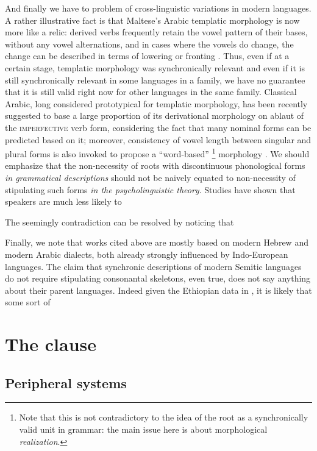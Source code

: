 \documentclass[a4paper, oneside, 12pt]{report}
\newcommand{\category}[1]{\textsc{#1}}
\begin{document}
And finally we have to problem of cross-linguistic variations in modern languages.
A rather illustrative fact is that Maltese's Arabic templatic morphology is now more like a relic:
derived verbs frequently retain the vowel pattern of their bases,
without any vowel alternations,
and in cases where the vowels do change,
the change can be described in terms of lowering or fronting
\citep{hoberman2008verbal}.
Thus, even if at a certain stage, templatic morphology was synchronically relevant
and even if it is still synchronically relevant in some languages in a family,
we have no guarantee that it is still valid right now
for other languages in the same family.
Classical Arabic, long considered prototypical for templatic morphology,
has been recently suggested to base a large proportion of its derivational morphology
on ablaut of the \category{imperfective} verb form,
considering the fact that many nominal forms can be predicted based on it;
moreover, consistency of vowel length between singular and plural forms is also invoked to propose
a ``word-based''%
\footnote{
    Note that this is not contradictory to the idea of the root as a synchronically valid unit in grammar:
    the main issue here is about morphological \emph{realization}.
}
morphology \citep{benmamoun20085}.
We should emphasize that the non-necessity of roots with discontinuous phonological forms
\emph{in grammatical descriptions}
should not be naively equated to non-necessity of stipulating such forms
\emph{in the psycholinguistic theory}.
Studies have shown that speakers are much less likely to 

The seemingly contradiction can be resolved by noticing that 

Finally, we note that works cited above are mostly based on modern Hebrew and modern Arabic dialects,
both already strongly influenced by Indo-European languages.
The claim that synchronic descriptions of modern Semitic languages
do not require stipulating consonantal skeletons,
even true, does not say anything about their parent languages.
Indeed given the Ethiopian data in \citet{rose2008formation},
it is likely that some sort of 

\section{The clause}

\subsection{Peripheral systems}
\end{document}
